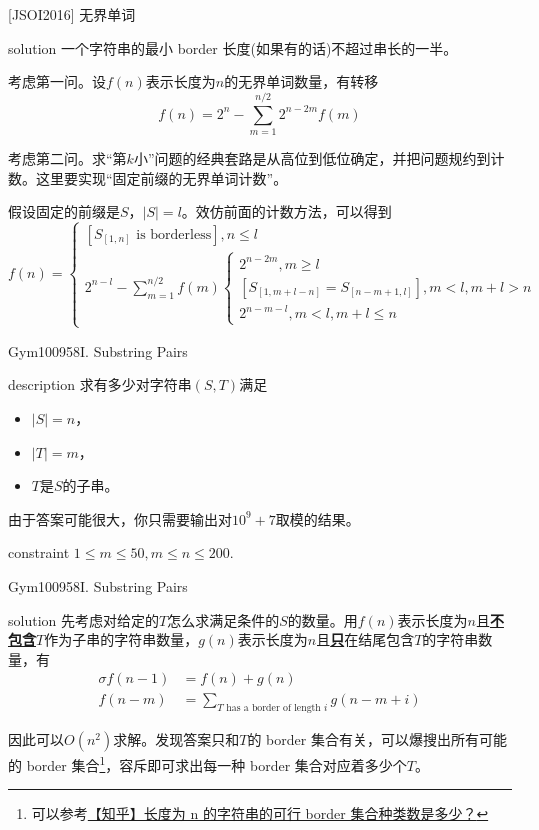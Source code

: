 \documentclass{beamer}
\theoremstyle{compact}
\def\obj#1{\textbf{\uline{#1}}}
\def\le{\leqslant}
\def\ge{\geqslant}
\begin{document}
\begin{frame}{[JSOI2016] 无界单词}
	\begin{block}{solution}
		一个字符串的最小 border 长度(如果有的话)不超过串长的一半。\pause

		考虑第一问。设$f(n)$表示长度为$n$的无界单词数量，有转移
		$$f(n) = 2^n - \sum_{m=1}^{n/2}2^{n-2m}f(m)$$\pause

		考虑第二问。求“第$k$小”问题的经典套路是从高位到低位确定，并把问题规约到计数。这里要实现“固定前缀的无界单词计数”。

		假设固定的前缀是$S$，$|S| = l$。效仿前面的计数方法，可以得到
		$$f(n) = \begin{cases}
			[S_{[1, n]} \textrm{ is borderless}], n \le l\\
			2^{n-l} - \sum\limits_{m=1}^{n/2}f(m)\begin{cases}
				2^{n-2m},  m \ge l\\
				[S_{[1, m+l-n]} = S_{[n-m+1, l]}],  m < l, m +l > n\\
				2^{n-m-l},  m < l, m + l \le n 
			\end{cases}
		\end{cases}$$
	\end{block}
\end{frame}
\begin{frame}{Gym100958I. Substring Pairs}
	\begin{block}{description}
		求有多少对字符串$(S, T)$满足
		\begin{itemize}
			\item $|S| = n$，
			\item $|T| = m$，
			\item $T$是$S$的子串。
		\end{itemize}

		由于答案可能很大，你只需要输出对$10^9 + 7$取模的结果。
	\end{block}
	\begin{block}{constraint}
		$1 \le m \le 50, m \le n \le 200.$
	\end{block}
\end{frame}
\begin{frame}{Gym100958I. Substring Pairs}
	\begin{block}{solution}
		先考虑对给定的$T$怎么求满足条件的$S$的数量。用$f(n)$表示长度为$n$且\obj{不包含}$T$作为子串的字符串数量，$g(n)$表示长度为$n$且\obj{只}在结尾包含$T$的字符串数量，有
		\begin{align*}
			\sigma f(n - 1) &= f(n) + g(n)\\
			f(n - m) &= \sum_{T \textrm{ has a border of length } i} g(n - m + i)
		\end{align*}

		因此可以$O(n^2)$求解。\pause 发现答案只和$T$的 border 集合有关，可以爆搜出所有可能的 border 集合\footnote{\tiny 可以参考\href{https://www.zhihu.com/question/287342987}{【知乎】长度为 n 的字符串的可行 border 集合种类数是多少？}}，容斥即可求出每一种 border 集合对应着多少个$T$。
	\end{block}
\end{frame}
\end{document}
